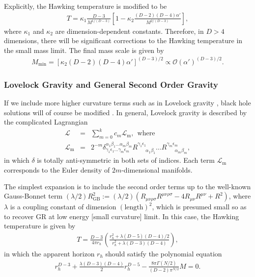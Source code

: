 \documentclass[12pt]{article}
\newcommand{\2}{$^2$}
\newcommand{\3}{$^3$}
\newcommand{\4}{$_4$}
\newcommand{\5}{$_5$}
\begin{document}
Explicitly, the Hawking temperature is modified to be
\begin{eqnarray}
T = \kappa_{1} \frac{D-3}{M^{1/(D-3)}} \left[ 1 - \kappa_{2} \frac{(D-2)(D-4)\alpha'}{M^{2/(D-3)}} \right],
\end{eqnarray}
where $\kappa_{1}$ and $\kappa_{2}$ are dimension-dependent constants. Therefore, in $D > 4$ dimensions, there will be significant corrections to the Hawking temperature in the small mass limit. The final mass scale is given by
\begin{eqnarray}
M_{\mathrm{min}} = \left[ \kappa_{2} (D-2)(D-4)\alpha' \right]^{(D-3)/2} \propto \mathcal{O}\left( \alpha' \right)^{(D-3)/2}.
\end{eqnarray}

\subsubsection{Lovelock Gravity and General Second Order Gravity}

If we include more higher curvature terms such as in Lovelock gravity \cite{Lovelock1, Lovelock2}, black hole solutions will of course be modified \cite{Myers:1988ze}. In general, Lovelock gravity  is described by the complicated Lagrangian
\begin{eqnarray}
\mathcal{L} &=& \sum_{m=0}^{k}c_{m} \mathcal{L}_\mathrm{m}, ~~\text{where}\\
\mathcal{L}_{\mathrm{m}} &=& 2^{-m} \delta^{\alpha_{1} \beta_{1} ... \alpha_{m} \beta_{m}}_{\gamma_{1} \epsilon_{1} ... \gamma_{m} \epsilon_{m}} R^{\gamma_{1}\epsilon_{1}}_{\;\;\;\;\;\;\alpha_{1}\beta_{1}} ... R^{\gamma_{m} \epsilon_{m}}_{\;\;\;\;\;\;\alpha_{m}\beta_{m}},
\end{eqnarray}
in which $\delta$ is totally anti-symmetric in both sets of indices. Each term $\mathcal{L}_{\mathrm{m}}$ corresponds to the Euler density of $2m$-dimensional manifolds.

The simplest expansion is to include the second order terms up to the well-known Gauss-Bonnet term $(\lambda/2) R_{\mathrm{GB}}^{2} := (\lambda/2) (R_{\mu\nu\rho\sigma}R^{\mu\nu\rho\sigma}-4 R_{\mu\nu}R^{\mu\nu}+R^{2})$, where $\lambda$ is a coupling constant of dimension $(\text{length})^2$, which is presumed small so as to recover GR at low energy [small curvature] limit. In this case, the Hawking temperature is given by 
\begin{eqnarray}
T = \frac{D-3}{4\pi r_{h}} \left( \frac{r_{h}^{2} + \lambda (D-5)(D-4)/ 2}{r_{h}^{2} + \lambda (D-3) (D-4)} \right),
\end{eqnarray}
in which the apparent horizon $r_{h}$ should satisfy the polynomial equation
\begin{eqnarray}
r_{h}^{D-3} + \frac{\lambda (D-3) (D-4)}{2} r_{h}^{D-5} - \frac{8\pi \Gamma(N/2)}{(D-2)\pi^{N/2}} M = 0.
\end{eqnarray}
\end{document}
